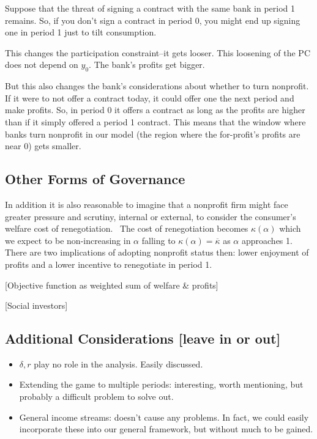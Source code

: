 \documentclass[11pt]{article}%
\begin{document}
Suppose that the threat of signing a contract with the same bank in period 1
remains. So, if you don't sign a contract in period 0, you might end up
signing one in period 1 just to tilt consumption.

This changes the participation constraint--it gets looser. This loosening of
the PC does not depend on $y_{0}$. The bank's profits get bigger.

But this also changes the bank's considerations about whether to turn
nonprofit. If it were to not offer a contract today, it could offer one the
next period and make profits. So, in period 0 it offers a contract as long as
the profits are higher than if it simply offered a period 1 contract. This
means that the window where banks turn nonprofit in our model (the region
where the for-profit's profits are near 0) gets smaller.

\subsection{Other Forms of Governance}

In addition it is also reasonable to imagine that a nonprofit firm might face
greater pressure and scrutiny, internal or external, to consider the
consumer's welfare cost of renegotiation. \ The cost of renegotiation becomes
$\kappa(\alpha)$ which we expect to be non-increasing in $\alpha$ falling to
$\kappa(\alpha)=\overline{\kappa}$ as $\alpha$ approaches 1. There are two
implications of adopting nonprofit status then: lower enjoyment of profits and
a lower incentive to renegotiate in period 1.

[Objective function as weighted sum of welfare \& profits]

[Social investors]

\subsection{Additional Considerations [leave in or out]}

\begin{itemize}
\item $\delta,r$ play no role in the analysis. Easily discussed.

\item Extending the game to multiple periods: interesting, worth mentioning,
but probably a difficult problem to solve out.

\item General income streams: doesn't cause any problems. In fact, we could
easily incorporate these into our general framework, but without much to be gained.
\end{itemize}
\end{document}

